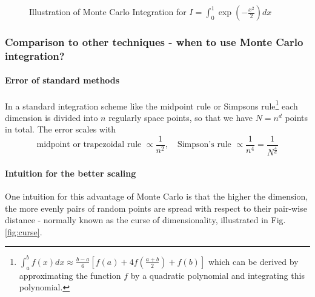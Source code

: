 \begin{figure}[!htb]
 \centering
 \hfill
 \caption{Illustration of Monte Carlo Integration for $I = \int_{0}^{1} \exp{\left(-\frac{x^2}{2}\right)} dx$}
 \label{fig:mcint}
\end{figure}

\subsubsection{Comparison to other techniques - when to use Monte Carlo integration?}
\paragraph*{Error of standard methods} In a standard integration scheme like the midpoint rule
or Simpsons rule\footnote{$\int_a^b f(x) d x \approx \frac{b-a}{6}\left[f(a)+4 f\left(\frac{a+b}{2}\right)+f(b)\right]$
which can be derived by approximating the function $f$ by a quadratic polynomial and integrating this polynomial.} each
dimension is divided into $n$ regularly space points, so that we have $N = n^d$ points in total. The error scales with
\begin{equation}
    \text{midpoint or trapezoidal rule } \propto \frac{1}{n^2}, \quad \text{Simpson's rule } \propto \frac{1}{n^4} = \frac{1}{N^{\frac{4}{d}}}
\end{equation}

\paragraph{Intuition for the better scaling} One intuition for this advantage of Monte Carlo is that the
higher the dimension, the more evenly pairs of random points are spread with respect to their pair-wise distance
- normally known as the curse of dimensionality, illustrated in Fig. \ref{fig:curse}.

